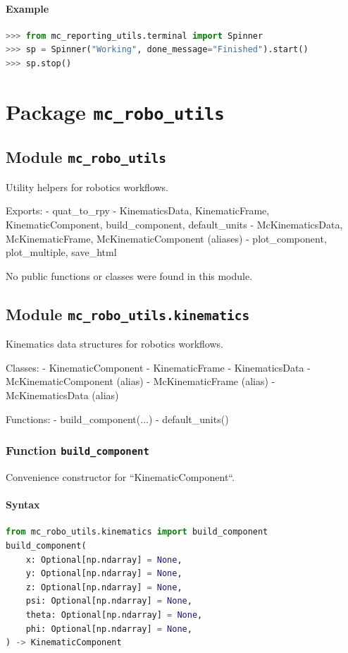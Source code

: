 \documentclass[11pt]{article}
\begin{document}
\paragraph{Example}
\begin{lstlisting}[language=Python]
>>> from mc_reporting_utils.terminal import Spinner
>>> sp = Spinner("Working", done_message="Finished").start()
>>> sp.stop()
\end{lstlisting}


\section{Package \texttt{mc\_robo\_utils}}
\subsection{Module \texttt{mc\_robo\_utils}}
Utility helpers for robotics workflows.

Exports:
- quat\_to\_rpy
- KinematicsData, KinematicFrame, KinematicComponent, build\_component, default\_units
- McKinematicsData, McKinematicFrame, McKinematicComponent (aliases)
- plot\_component, plot\_multiple, save\_html

No public functions or classes were found in this module.

\subsection{Module \texttt{mc\_robo\_utils.kinematics}}
Kinematics data structures for robotics workflows.

Classes:
- KinematicComponent
- KinematicFrame
- KinematicsData
- McKinematicComponent (alias)
- McKinematicFrame (alias)
- McKinematicsData (alias)

Functions:
- build\_component(...)
- default\_units()

\subsubsection{Function \texttt{build\_component}}
Convenience constructor for ``KinematicComponent``.

\paragraph{Syntax}
\begin{lstlisting}[language=Python]
from mc_robo_utils.kinematics import build_component
build_component(
    x: Optional[np.ndarray] = None,
    y: Optional[np.ndarray] = None,
    z: Optional[np.ndarray] = None,
    psi: Optional[np.ndarray] = None,
    theta: Optional[np.ndarray] = None,
    phi: Optional[np.ndarray] = None,
) -> KinematicComponent
\end{lstlisting}
\end{document}
